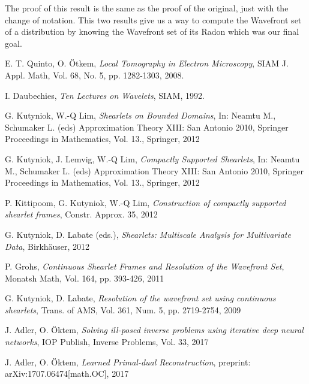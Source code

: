 \documentclass[a4paper]{article}
\begin{document}
\bigskip

The proof of this result is the same as the proof of the original, just with the change of notation. This two results give us a way to compute the Wavefront set of a distribution by knowing the Wavefront set of its Radon which was our final goal.


\begin{thebibliography}{90}

	E. T. Quinto, O. \"Otkem,
	\emph{Local Tomography in Electron Microscopy},
	SIAM J. Appl. Math, Vol. 68, No. 5, pp. 1282-1303,
	2008.

	I. Daubechies, 
	\emph{Ten Lectures on Wavelets},
	SIAM, 
	1992.

	G. Kutyniok, W.-Q Lim,
	\emph{Shearlets on Bounded Domains},
	In: Neamtu M., Schumaker L. (eds) Approximation Theory XIII: San Antonio 2010, 
	Springer Proceedings in Mathematics, Vol. 13.,
	Springer, 
	2012

	G. Kutyniok, J. Lemvig, W.-Q Lim, 
	\emph{Compactly Supported Shearlets},
	In: Neamtu M., Schumaker L. (eds) Approximation Theory XIII: San Antonio 2010,
	Springer Proceedings in Mathematics, Vol. 13.,
	Springer, 
	2012

	P. Kittipoom, G. Kutyniok, W.-Q Lim, 
	\emph{Construction of compactly supported shearlet frames},
	Constr. Approx. 35,
	2012

	G. Kutyniok, D. Labate (eds.),
	\emph{Shearlets: Multiscale Analysis for Multivariate Data},
	Birkh\"auser,
	2012

	P. Grohs,
	\emph{Continuous Shearlet Frames and Resolution of the Wavefront Set},
	Monatsh Math, Vol. 164, pp. 393-426,
	2011

	G. Kutyniok, D. Labate,
	\emph{Resolution of the wavefront set using continuous shearlets},
	Trans. of AMS, Vol. 361, Num. 5, pp. 2719-2754,
	2009

	J. Adler, O. \"Oktem, 
	\emph{Solving ill-posed inverse problems using iterative deep neural networks},
	IOP Publish, Inverse Problems, Vol. 33,
	2017

	J. Adler, O. \"Oktem,
	\emph{Learned Primal-dual Reconstruction},
	preprint: arXiv:1707.06474[math.OC],
	2017

\end{thebibliography}
\end{document}
